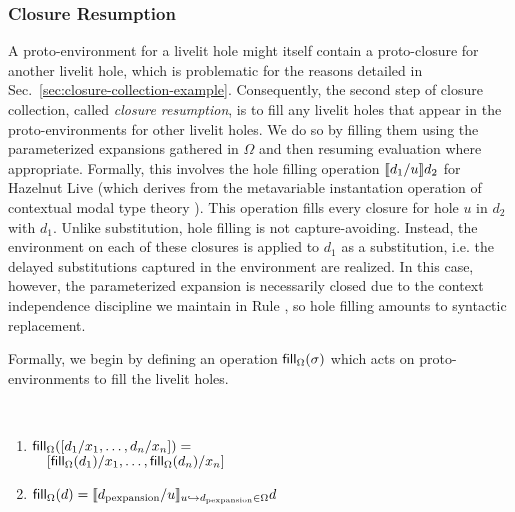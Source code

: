 \subsubsection{Closure Resumption}
A proto-environment for a livelit hole might itself contain a proto-closure for another livelit hole,
which is problematic for the reasons detailed in Sec.~\ref{sec:closure-collection-example}.
Consequently, the second step of closure collection, called \emph{closure resumption}, is to fill any livelit holes that appear in the proto-environments for other livelit holes.
We do so by filling them using the parameterized expansions gathered in $\Omega$ and then resuming
evaluation where appropriate.
Formally, this involves the hole filling operation $\llbracket d_1 / u\rrbracket d_2$ for Hazelnut Live
(which derives from the metavariable instantation operation of contextual modal type theory \cite{HazelnutLive,Nanevski2008}).
This operation
fills every closure for hole $u$ in $d_2$ with $d_1$.
Unlike substitution, hole filling is
not capture-avoiding. Instead, the environment on each of these closures is applied to $d_1$
as a substitution, i.e. the delayed substitutions captured in the environment are realized.
In this case, however, the parameterized expansion is necessarily closed due to
the context independence discipline we maintain in Rule ,
so hole filling amounts to syntactic replacement.

Formally, we begin by defining an operation $\mathsf{fill}_{\Omega}(\sigma)$ which acts on proto-environments
to fill the livelit holes.

\begin{definition} ~
    \begin{enumerate}
        \item $\mathsf{fill}_{\Omega}([d_1/x_1, \ldots, d_n/x_n]) = $\\
        $\hspace{10px}[\fillof{\Omega}{d_1}/x_1, \ldots, \fillof{\Omega}{d_n}/x_n]$
        \item $\mathsf{fill}_{\Omega}(d) = \llbracket d_\text{pexpansion} / u\rrbracket_{u \hookrightarrow d_\text{pexpansion} \in \Omega}{d}$
    \end{enumerate}
\end{definition}

